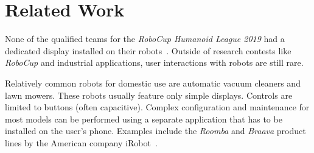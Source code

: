 \chapter{Related Work}
\label{related-work}

None of the qualified teams for the \textit{RoboCup Humanoid League 2019} had a dedicated display
installed on their robots~\cite{robocup-humanoid-teams}. Outside of research contests like
\textit{RoboCup} and industrial applications, user interactions with robots are still rare.

Relatively common robots for domestic use are automatic vacuum cleaners and lawn mowers. These robots
usually feature only simple displays. Controls are limited to buttons (often capacitive). Complex
configuration and maintenance for most models can be performed using a separate application that has
to be installed on the user's phone. Examples include the \textit{Roomba} and \textit{Braava} product
lines by the American company iRobot~\cite{irobot-website}.
